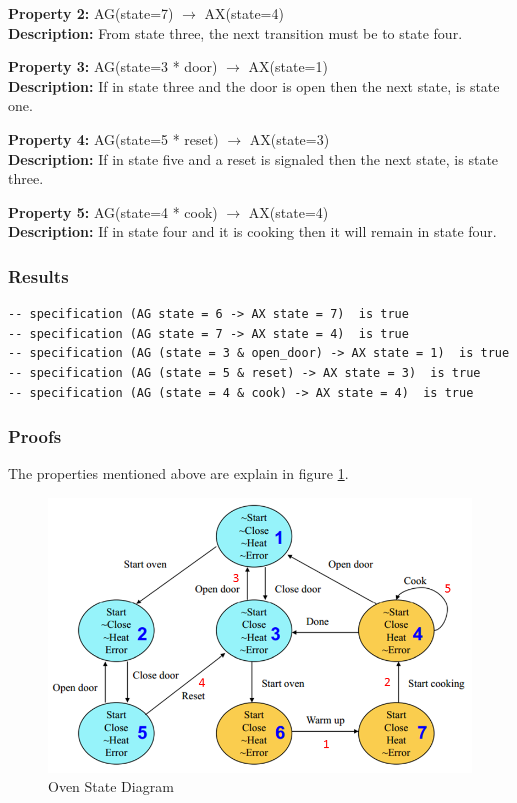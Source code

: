 \documentclass[11pt]{article}
\begin{document}
		\textbf{Property 2:} AG(state=7) $\to$ AX(state=4)\\ 
		\textbf{Description:} From state three, the next transition must be to state four. \\
		\vspace{12pt}
		
		\textbf{Property 3:} 	AG(state=3 * door) $\to$ AX(state=1)\\ 
		\textbf{Description:} If in state three and the door is open then the next state, is state one. \\
		\vspace{12pt}
		
		\textbf{Property 4:} AG(state=5 * reset) $\to$ AX(state=3) \\
		\textbf{Description:} If in state five and a reset is signaled then the next state, is state three.\\
		\vspace{12pt}
		
		\textbf{Property 5:} AG(state=4 * cook) $\to$ AX(state=4)  \\
		\textbf{Description:} If in state four and it is cooking then it will remain in state four.\\
		
		
	
	\subsubsection{Results}
		\begin{lstlisting}[caption=NuSMV Kripke Diagram Output, label=p2_2_out]	
-- specification (AG state = 6 -> AX state = 7)  is true
-- specification (AG state = 7 -> AX state = 4)  is true
-- specification (AG (state = 3 & open_door) -> AX state = 1)  is true
-- specification (AG (state = 5 & reset) -> AX state = 3)  is true
-- specification (AG (state = 4 & cook) -> AX state = 4)  is true
		\end{lstlisting}
	
	
	\subsubsection{Proofs}
	The properties mentioned above are explain in figure \ref{p2_2_p}.
	\begin{figure}[h]\centering
	\includegraphics[height=0.45\textwidth]{images/p2_2_proof.png}
		\caption{Oven State Diagram}
			\label{p2_2_p}
		\end{figure}
\end{document}
